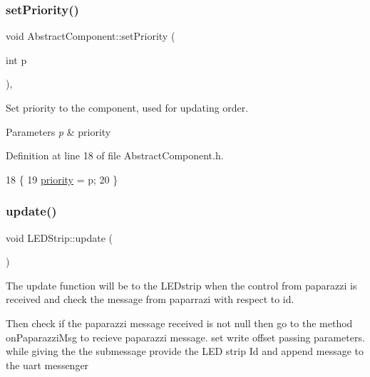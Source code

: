 \subsubsection{\texorpdfstring{set\+Priority()}{setPriority()}}
{\footnotesize\ttfamily void Abstract\+Component\+::set\+Priority (\begin{DoxyParamCaption}\item[{int}]{p }\end{DoxyParamCaption})\hspace{0.3cm}{\ttfamily [inline]}, {\ttfamily [inherited]}}



Set priority to the component, used for updating order. 


\begin{DoxyParams}{Parameters}
{\em p} & priority \\
\hline
\end{DoxyParams}


Definition at line 18 of file Abstract\+Component.\+h.


\begin{DoxyCode}
18                             \{
19         \hyperlink{class_abstract_component_aff57dfa5f31be093a06b55560e33fb95}{priority} = p;
20     \}
\end{DoxyCode}
\mbox{\label{class_l_e_d_strip_abc57d90870bb0e9c0d05e7ba6ca76c95}} 
\subsubsection{\texorpdfstring{update()}{update()}}
{\footnotesize\ttfamily void L\+E\+D\+Strip\+::update (\begin{DoxyParamCaption}{ }\end{DoxyParamCaption})\hspace{0.3cm}{\ttfamily [virtual]}}



The update function will be to the L\+E\+Dstrip when the control from paparazzi is received and check the message from paparrazi with respect to id. 

Then check if the paparazzi message received is not null then go to the method on\+Paparazzi\+Msg to recieve paparazzi message. set write offset passing parameters. while giving the the submessage provide the L\+ED strip Id and append message to the uart messenger 

